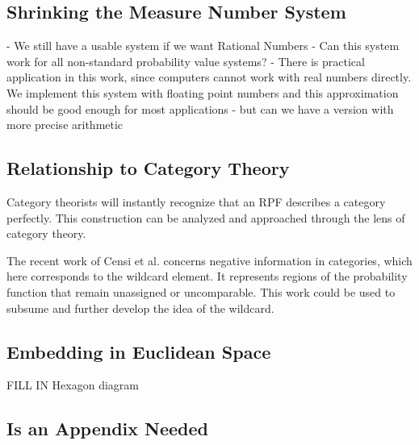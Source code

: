 \documentclass[twoside]{article}
\theoremstyle{plain}%
\theoremstyle{definition}
\theoremstyle{remark}
\begin{document}
\subsection{Shrinking the Measure Number System}
- We still have a usable system if we want Rational Numbers
- Can this system work for all non-standard probability value systems?
- There is practical application in this work, since computers cannot work with real numbers directly. We implement this system with floating point numbers and this approximation should be good enough for most applications - but can we have a version with more precise arithmetic
\subsection{Relationship to Category Theory}

Category theorists will instantly recognize that an RPF describes a category perfectly. This construction can be analyzed and approached through the lens of category theory.

The recent work of Censi et al.\cite{censi} concerns negative information in categories, which here corresponds to the wildcard element. It represents regions of the probability function that remain unassigned or uncomparable. This work could be used to subsume and further develop the idea of the wildcard.
\subsection{Embedding in Euclidean Space}
\label{section:euclidean_embedding}
FILL IN
Hexagon diagram
\begin{appendices}

\section{Is an Appendix Needed}

\end{appendices}

\end{document}
